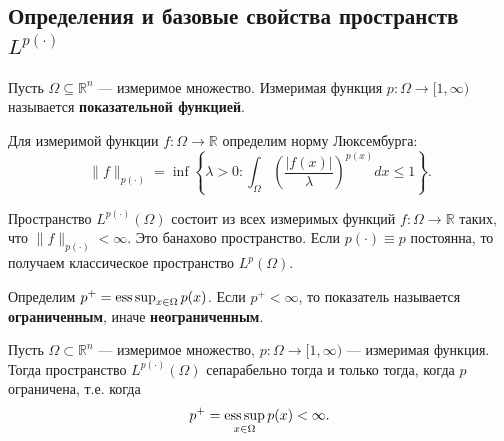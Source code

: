 \documentclass[../NDCNNAI_main.tex]{subfiles}
\begin{document}
\subsection{Определения и базовые свойства пространств \( L^{p(\cdot)} \)}

\begin{definition}
Пусть \( \Omega \subseteq \mathbb{R}^n \) --- измеримое множество. Измеримая функция \( p\colon \Omega \to [1, \infty) \) называется \textbf{показательной функцией}.
\end{definition}

\begin{definition}
Для измеримой функции \( f\colon \Omega \to \mathbb{R} \) определим норму Люксембурга:
\[
\|f\|_{p(\cdot)} = \inf \left\{ \lambda > 0 \colon \int_{\Omega} \left( \frac{|f(x)|}{\lambda} \right)^{p(x)} dx \leq 1 \right\}.
\]
\end{definition}

\begin{definition}
Пространство \( L^{p(\cdot)}(\Omega) \) состоит из всех измеримых функций \( f\colon \Omega \to \mathbb{R} \) таких, что \( \|f\|_{p(\cdot)} < \infty \). Это банахово пространство. Если \( p(\cdot) \equiv p \) постоянна, то получаем классическое пространство \( L^p(\Omega) \).
\end{definition}

\begin{definition}
Определим \( p^+ = \operatorname*{ess\,sup}_{x \in \Omega} p(x) \). Если \( p^+ < \infty \), то показатель называется \textbf{ограниченным}, иначе \textbf{неограниченным}.
\end{definition}

\begin{theorem}
Пусть \( \Omega \subset \mathbb{R}^n \) --- измеримое множество, \( p \colon \Omega \to [1, \infty) \) --- измеримая функция. Тогда пространство \( L^{p(\cdot)}(\Omega) \) сепарабельно тогда и только тогда, когда \( p \) ограничена, т.е. когда
\[
p^+ = \operatorname*{ess\,sup}_{x \in \Omega} p(x) < \infty.
\]
\end{theorem}
\end{document}
